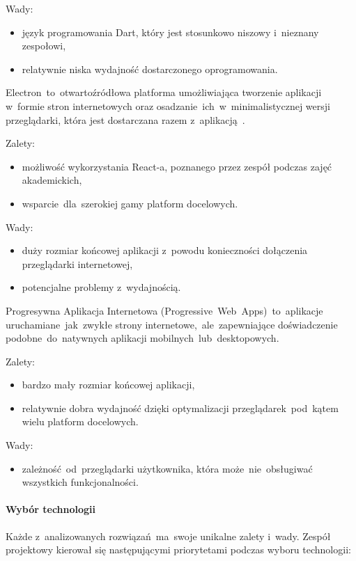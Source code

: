 Wady:
\begin{itemize}
    \item język programowania Dart, który jest stosunkowo niszowy i~nieznany zespołowi,
    \item relatywnie niska wydajność dostarczonego oprogramowania\cite{flutter-perf}.
\end{itemize}

\indent Electron~to~otwartoźródłowa platforma umożliwiająca tworzenie aplikacji w~formie stron internetowych oraz osadzanie~ich~w~minimalistycznej wersji przeglądarki, która jest dostarczana razem z~aplikacją~\cite{electron-in-action}.

Zalety:
\begin{itemize}
    \item możliwość wykorzystania React-a, poznanego przez zespół podczas zajęć akademickich,
    \item wsparcie~dla~szerokiej gamy platform docelowych.
\end{itemize}

Wady:
\begin{itemize}
    \item duży rozmiar końcowej aplikacji z~powodu konieczności dołączenia przeglądarki internetowej,
    \item potencjalne problemy z~wydajnością.
\end{itemize}

\indent Progresywna Aplikacja Internetowa (Progressive~Web~Apps)~to~aplikacje uruchamiane~jak~zwykłe strony internetowe,~ale~zapewniające doświadczenie podobne~do~natywnych aplikacji mobilnych~lub~desktopowych.\cite{pwa-book}

Zalety:
\begin{itemize}
    \item bardzo mały rozmiar końcowej aplikacji,
    \item relatywnie dobra wydajność dzięki optymalizacji przeglądarek~pod~kątem wielu platform docelowych.
\end{itemize}

Wady:
\begin{itemize}
    \item zależność~od~przeglądarki użytkownika, która może~nie~obsługiwać wszystkich funkcjonalności.
\end{itemize}

\paragraph{Wybór technologii}
\indent Każde z~analizowanych rozwiązań~ma~swoje unikalne zalety i~wady.
Zespół projektowy kierował się następującymi priorytetami podczas wyboru technologii:

